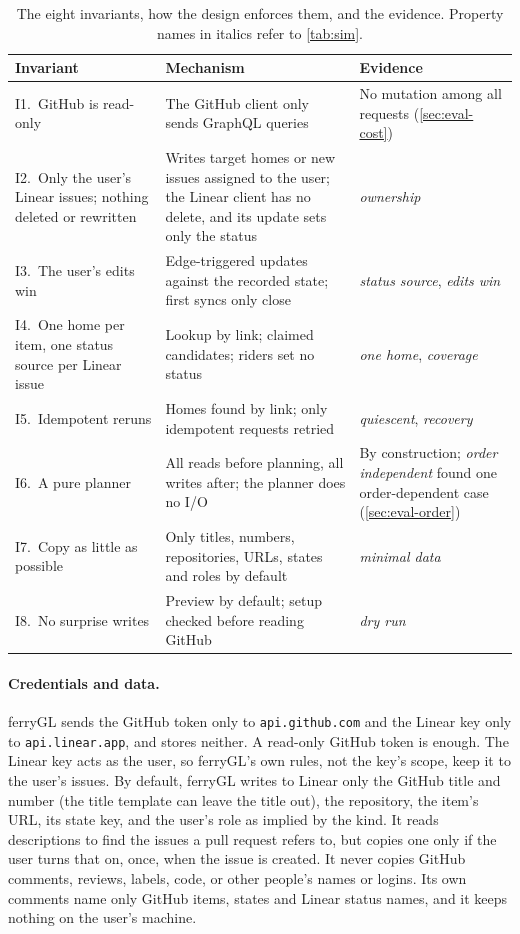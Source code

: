 \documentclass[11pt,a4paper]{article}
\newcommand{\ferry}{ferryGL}
\newcommand{\code}[1]{\texttt{#1}}
\begin{document}
\begin{table}[t]
  \centering\small
  \caption{The eight invariants, how the design enforces them, and the evidence. Property
    names in italics refer to \cref{tab:sim}.}
  \label{tab:invariants}
  \begin{tabularx}{\linewidth}{@{}>{\raggedright\arraybackslash}p{3.35cm} >{\raggedright\arraybackslash}X >{\raggedright\arraybackslash}p{3.7cm}@{}}
    \toprule
    Invariant & Mechanism & Evidence \\
    \midrule
    I1.\ GitHub is read-only & The GitHub client only sends GraphQL queries & No mutation among all requests (\cref{sec:eval-cost}) \\
    I2.\ Only the user's Linear issues; nothing deleted or rewritten & Writes target homes or new issues assigned to the user; the Linear client has no delete, and its update sets only the status & \emph{ownership} \\
    I3.\ The user's edits win & Edge-triggered updates against the recorded state; first syncs only close & \emph{status source}, \emph{edits win} \\
    I4.\ One home per item, one status source per Linear issue & Lookup by link; claimed candidates; riders set no status & \emph{one home}, \emph{coverage} \\
    I5.\ Idempotent reruns & Homes found by link; only idempotent requests retried & \emph{quiescent}, \emph{recovery} \\
    I6.\ A pure planner & All reads before planning, all writes after; the planner does no I/O & By construction; \emph{order independent} found one order-dependent case (\cref{sec:eval-order}) \\
    I7.\ Copy as little as possible & Only titles, numbers, repositories, URLs, states and roles by default & \emph{minimal data} \\
    I8.\ No surprise writes & Preview by default; setup checked before reading GitHub & \emph{dry run} \\
    \bottomrule
  \end{tabularx}
\end{table}

\paragraph{Credentials and data.} \ferry{} sends the GitHub token only to \code{api.github.com}
and the Linear key only to \code{api.linear.app}, and stores neither. A read-only GitHub token is
enough. The Linear key acts as the user, so \ferry's own rules, not the key's scope, keep it to
the user's issues. By default, \ferry{} writes to Linear only the GitHub title and number (the
title template can leave the title out), the repository, the item's URL, its state key, and the
user's role as implied by the kind. It reads descriptions to find the issues a pull request
refers to, but copies one only if the user turns that on, once, when the issue is created. It
never copies GitHub comments, reviews, labels, code, or other people's names or logins. Its own
comments name only GitHub items, states and Linear status names, and it keeps nothing on the
user's machine.
\end{document}

